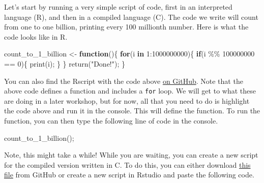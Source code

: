 \documentclass[
]{article}
\newenvironment{Shaded}{\begin{snugshade}}{\end{snugshade}}
\newcommand{\ControlFlowTok}[1]{\textcolor[rgb]{0.13,0.29,0.53}{\textbf{#1}}}
\newcommand{\DecValTok}[1]{\textcolor[rgb]{0.00,0.00,0.81}{#1}}
\newcommand{\FunctionTok}[1]{\textcolor[rgb]{0.00,0.00,0.00}{#1}}
\newcommand{\NormalTok}[1]{#1}
\newcommand{\OtherTok}[1]{\textcolor[rgb]{0.56,0.35,0.01}{#1}}
\newcommand{\SpecialCharTok}[1]{\textcolor[rgb]{0.00,0.00,0.00}{#1}}
\newcommand{\StringTok}[1]{\textcolor[rgb]{0.31,0.60,0.02}{#1}}
\begin{document}
Let's start by running a very simple script of code, first in an
interpreted language (R), and then in a compiled language (C). The code
we write will count from one to one billion, printing every 100
millionth number. Here is what the code looks like in R.

\begin{Shaded}
\begin{Highlighting}[]
\NormalTok{count\_to\_1\_billion }\OtherTok{\textless{}{-}} \ControlFlowTok{function}\NormalTok{()\{}
    \ControlFlowTok{for}\NormalTok{(i }\ControlFlowTok{in} \DecValTok{1}\SpecialCharTok{:}\DecValTok{1000000000}\NormalTok{)\{}
        \ControlFlowTok{if}\NormalTok{(i }\SpecialCharTok{\%\%} \DecValTok{100000000} \SpecialCharTok{==} \DecValTok{0}\NormalTok{)\{}
          \FunctionTok{print}\NormalTok{(i);}
\NormalTok{        \}  }
\NormalTok{    \}}
    \FunctionTok{return}\NormalTok{(}\StringTok{"Done!"}\NormalTok{);}
\NormalTok{\}}
\end{Highlighting}
\end{Shaded}

You can also find the Rscript with the code above
\href{https://github.com/StirlingCodingClub/coding_types/blob/main/count_to_1_billion.R}{on
GitHub}. Note that the above code defines a function and includes a
\texttt{for} loop. We will get to what these are doing in a later
workshop, but for now, all that you need to do is highlight the code
above and run it in the console. This will define the function. To run
the function, you can then type the following line of code in the
console.

\begin{Shaded}
\begin{Highlighting}[]
\FunctionTok{count\_to\_1\_billion}\NormalTok{();}
\end{Highlighting}
\end{Shaded}

Note, this might take a while! While you are waiting, you can create a
new script for the compiled version written in C. To do this, you can
either download
\href{https://github.com/StirlingCodingClub/coding_types/blob/main/count_to_1_billion.c}{this
file} from GitHub or create a new script in Rstudio and paste the
following code.
\end{document}
